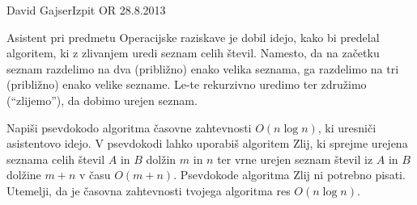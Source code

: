 \begin{naloga}{David Gajser}{Izpit OR 28.8.2013}
\begin{vprasanje}
Asistent pri predmetu Operacijske raziskave je dobil idejo,
kako bi predelal algoritem, ki z zlivanjem uredi seznam celih števil.
Namesto,
da na začetku seznam razdelimo na dva (približno) enako velika seznama,
ga razdelimo na tri (približno) enako velike sezname.
Le-te rekurzivno uredimo ter združimo (``zlijemo''), da dobimo urejen seznam.

Napiši psevdokodo algoritma časovne zahtevnosti $O(n \log n)$,
ki uresniči asistentovo idejo.
V psevdokodi lahko uporabiš algoritem {\sc Zlij},
ki sprejme urejena seznama celih števil $A$ in $B$ dolžin $m$ in $n$
ter vrne urejen seznam števil iz $A$ in $B$ dolžine $m+n$ v času $O(m+n)$.
Psevdokode algoritma {\sc Zlij} ni potrebno pisati.
Utemelji, da je časovna zahtevnosti tvojega algoritma res $O(n \log n)$.
\end{vprasanje}
\begin{odgovor}
\end{odgovor}
\end{naloga}
